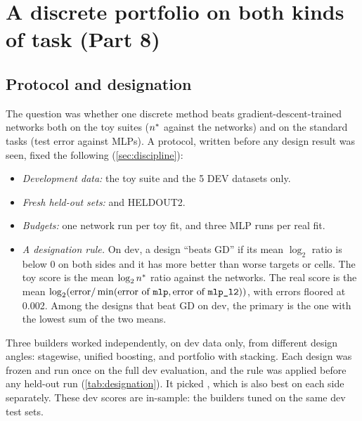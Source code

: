 \section{A discrete portfolio on both kinds of task (Part 8)}\label{sec:portfolio}

\subsection{Protocol and designation}\label{sec:protocol8}

The question was whether one discrete method beats gradient-descent-trained networks both on the toy suites ($n^{*}$ against the networks) and on the standard tasks (test error against MLPs). A protocol, written before any design result was seen, fixed the following (\cref{sec:discipline}):
\begin{itemize}
\item \emph{Development data:} the toy  suite and the 5 DEV datasets only.
\item \emph{Fresh held-out sets:}  and HELDOUT2.
\item \emph{Budgets:} one network run per toy fit, and three MLP runs per real fit.
\item \emph{A designation rule.} On dev, a design ``beats GD'' if its mean $\log_2$ ratio is below 0 on both sides and it has more better than worse targets or cells. The toy score is the mean $\log_2n^{*}$ ratio against the networks. The real score is the mean $\log_2(\text{error}/\min(\text{error of }\code{mlp},\text{error of }\code{mlp_l2}))$, with errors floored at 0.002. Among the designs that beat GD on dev, the primary is the one with the lowest sum of the two means.
\end{itemize}
Three builders worked independently, on dev data only, from different design angles: stagewise, unified boosting, and portfolio with stacking. Each design was frozen and run once on the full dev evaluation, and the rule was applied before any held-out run (\cref{tab:designation}). It picked , which is also best on each side separately. These dev scores are in-sample: the builders tuned on the same dev test sets.

